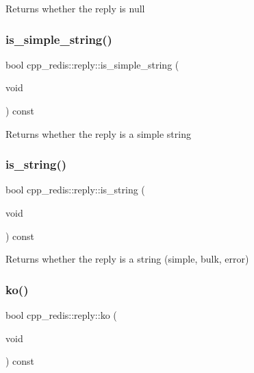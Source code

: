 \begin{DoxyReturn}{Returns}
whether the reply is null 
\end{DoxyReturn}
\mbox{\label{classcpp__redis_1_1reply_aeb92f6f84d226239e9800893ab6062ca}} 
\subsubsection{\texorpdfstring{is\+\_\+simple\+\_\+string()}{is\_simple\_string()}}
{\footnotesize\ttfamily bool cpp\+\_\+redis\+::reply\+::is\+\_\+simple\+\_\+string (\begin{DoxyParamCaption}\item[{void}]{ }\end{DoxyParamCaption}) const}

\begin{DoxyReturn}{Returns}
whether the reply is a simple string 
\end{DoxyReturn}
\mbox{\label{classcpp__redis_1_1reply_a7072729490fdbad26ddeb02df8002147}} 
\subsubsection{\texorpdfstring{is\+\_\+string()}{is\_string()}}
{\footnotesize\ttfamily bool cpp\+\_\+redis\+::reply\+::is\+\_\+string (\begin{DoxyParamCaption}\item[{void}]{ }\end{DoxyParamCaption}) const}

\begin{DoxyReturn}{Returns}
whether the reply is a string (simple, bulk, error) 
\end{DoxyReturn}
\mbox{\label{classcpp__redis_1_1reply_a17e261cc8e7686bb2126d7df9223611a}} 
\subsubsection{\texorpdfstring{ko()}{ko()}}
{\footnotesize\ttfamily bool cpp\+\_\+redis\+::reply\+::ko (\begin{DoxyParamCaption}\item[{void}]{ }\end{DoxyParamCaption}) const}

